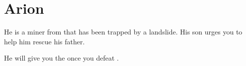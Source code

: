 \section{Arion}
\label{char:arion}


He is a miner from  that has been trapped by a landslide. His son  urges you to help him rescue his father.

He will give you the  once you defeat .
